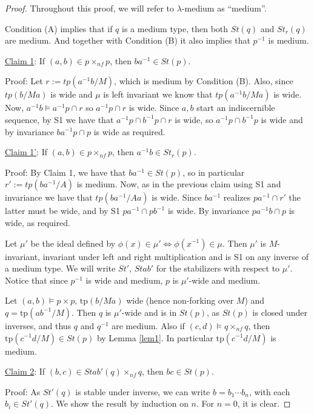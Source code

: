 \documentclass[12pt]{article}
\theoremstyle{definition}
\theoremstyle{mystyle}
\theoremstyle{remark}
\newcommand{\tp}{\mathrm{tp}}
\newcommand{\nf}{\times_{nf}}
\begin{document}
\begin{proof}
Throughout this proof, we will refer to $\lambda$-medium as
``medium''.

Condition (A) implies that if $q$ is a medium type, then both
$St(q)$ and $St_r(q)$ are medium. And together with Condition (B)
it also implies that $p^{-1}$ is medium.

\medskip
\noindent \underline{Claim 1}: If $(a,b)\in p \nf p$, then $ba^{-1}\in St(p)$.

\noindent Proof: Let $r:=tp(a^{-1}b/M)$, which is medium by
Condition (B). Also, since $tp(b/Ma)$ is wide and $\mu$ is left
invariant we know that $tp(a^{-1}b/Ma)$ is wide. Now,
$a^{-1}b\models a^{-1}p\cap r$ so $a^{-1}p\cap r$ is wide. Since
$a,b$ start an  indiscernible sequence, by S1 we have that
$a^{-1}p\cap b^{-1}p\cap r$ is wide, so $a^{-1}p\cap b^{-1}p$ is
wide and by invariance $ba^{-1}p\cap p$ is wide as required.

\medskip
\noindent \underline{Claim 1'}: If $(a,b)\in p \nf p$, then $a^{-1}b\in St_r(p)$.

\noindent Proof: By Claim 1, we have that $ba^{-1} \in St(p)$, so
in particular $r':=tp(ba^{-1}/A)$ is medium. Now, as in the
previous claim using S1 and invariance we have that
$tp(ba^{-1}/Aa)$ is wide. Since $ba^{-1}$ realizes $pa^{-1}\cap
r'$ the latter must be wide, and by S1 $pa^{-1}\cap pb^{-1}$ is
wide. By invariance $pa^{-1}b\cap p$ is wide, as required.


\medskip
Let $\mu'$ be the ideal defined by $\phi(x)\in \mu' \iff
\phi(x^{-1})\in \mu$. Then $\mu'$ is $M$-invariant, invariant
under left and right multiplication and is S1 on any inverse of a
medium type. We will write $St'$, $Stab'$ for the stabilizers with
respect to $\mu'$. Notice that since $p^{-1}$ is wide and medium,
$p$ is $\mu'$-wide and medium.

Let $(a,b)\models p\times p$, $\tp(b/Ma)$ wide (hence non-forking
over $M$) and $q=\tp(ab^{-1}/M)$. Then $q$ is $\mu'$-wide and is
in $St(p)$, as $St(p)$ is closed under inverses, and thus $q$ and
$q^{-1}$ are medium. Also if $(c,d)\models q\nf q$, then
$\tp(c^{-1} d/M) \in St(p)$ by Lemma \ref{lem1}. In particular
$\tp(c^{-1}d/M)$ is medium.

\smallskip \noindent
\underline{Claim 2}: If $(b,c)\in Stab'(q)\nf q$, then $bc\in St(p)$.

\noindent
Proof: As $St'(q)$ is stable under inverse, we can write $b=b_1\cdots b_n$, with each $b_i \in St'(q)$. We show the result by induction on $n$. For $n=0$, it is clear.


\end{proof}
\end{document}
